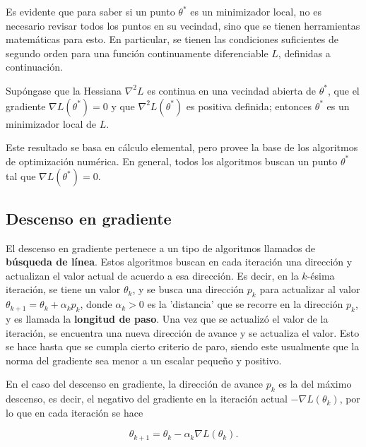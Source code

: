 Es evidente que para saber si un punto $\theta^*$ es un minimizador local, no es necesario revisar todos los puntos en su vecindad, sino que se tienen herramientas matemáticas para esto. En particular, se tienen las condiciones suficientes de segundo orden para una función continuamente diferenciable $L$, definidas a continuación.

Supóngase que la Hessiana $\nabla^2 L$ es continua en una vecindad abierta de $\theta^*$, que el gradiente $\nabla L(\theta^*) = 0$ y que $\nabla^2 L(\theta^*)$ es positiva definida; entonces $\theta^*$ es un minimizador local de $L$.

Este resultado se basa en cálculo elemental, pero provee la base de los algoritmos de optimización numérica. En general, todos los algoritmos buscan un punto $\theta^*$ tal que $\nabla L(\theta^*) = 0$. 





\subsection{Descenso en gradiente}
\label{sec:descenso_gradiente}

El descenso en gradiente pertenece a un tipo de algoritmos llamados de \textbf{búsqueda de línea}. Estos algoritmos buscan en cada iteración una dirección y actualizan el valor actual de acuerdo a esa dirección. Es decir, en la $k$-ésima iteración, se tiene un valor $\theta_k$, y se busca una dirección $p_k$ para actualizar al valor $\theta_{k+1} = \theta_k + \alpha_k p_k$, donde $\alpha_k > 0$ es la 'distancia' que se recorre en la dirección $p_k$, y es llamada la \textbf{longitud de paso}. Una vez que se actualizó el valor de la iteración, se encuentra una nueva dirección de avance y se actualiza el valor. Esto se hace hasta que se cumpla cierto criterio de paro, siendo este usualmente que la norma del gradiente sea menor a un escalar pequeño y positivo.

En el caso del descenso en gradiente, la dirección de avance $p_k$ es la del máximo descenso, es decir, el negativo del gradiente en la iteración actual $-\nabla L(\theta_k)$, por lo que en cada iteración se hace

\begin{equation}
  \label{eq:iteracion_descenso_grad}
  \theta_{k+1} = \theta_k - \alpha_k \nabla L(\theta_k).
\end{equation}

